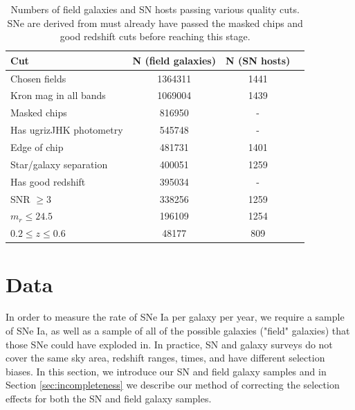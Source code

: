 \documentclass[fleqn,usenatbib]{mnras}
\begin{document}
\begin{table}
	\centering
	\caption{Numbers of field galaxies and SN hosts passing various quality cuts. SNe are derived from must already have passed the masked chips and good redshift cuts before reaching this stage.}
	\label{tab:cuts}
	\begin{tabular}{lccr} %
		\hline
		Cut & N (field galaxies)  & N (SN hosts)\\
		\hline
		Chosen fields & 1364311  & 1441\\
	    Kron mag in all bands & 1069004  & 1439 \\
	    Masked chips & 816950  & - \\
	    Has ugrizJHK photometry & 545748  & -\\
	    Edge of chip & 481731 & 1401 \\
	    Star/galaxy separation & 400051 &  1259\\
	    Has good redshift & 395034 & - \\
	    SNR $\geq 3$& 338256  & 1259 \\
	    $m_r \leq 24.5$ & 196109 &  1254 \\
	    $0.2 \leq z \leq 0.6$ & 48177 & 809\\ 
	    
		\hline
	\end{tabular}
\end{table}

\section{Data}

In order to measure the rate of SNe Ia per galaxy per year, we require a sample of SNe Ia, as well as a sample of all of the possible galaxies ("field" galaxies) that those SNe could have exploded in. In practice, SN and galaxy surveys do not cover the same sky area, redshift ranges, times, and have different selection biases. In this section, we introduce our SN and field galaxy samples and in Section \ref{sec:incompleteness} we describe our method of correcting the selection effects for both the SN and field galaxy samples.

\label{sec:data}
\end{document}
